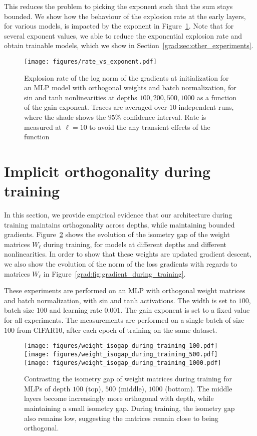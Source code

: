 This reduces the problem to picking the exponent such that the sum stays bounded. We show how the behaviour of the explosion rate at the early layers, for various models, is impacted by the exponent in Figure~\ref{grad:fig:rate_vs_exponent}. Note that for several exponent values, we able to reduce the exponential explosion rate and obtain trainable models, which we show in Section~\ref{grad:sec:other_experiments}.

\begin{figure}[ht]
    \centering
    \texttt{[image: figures/rate\_vs\_exponent.pdf]}
    \caption{Explosion rate of the log norm of the gradients at initialization for an MLP model with orthogonal weights and batch normalization, for sin and tanh nonlinearities at depths $100, 200, 500, 1000$ as a function of the gain exponent. Traces are averaged over $10$ independent runs, where the shade shows the $95\%$ confidence interval. Rate is measured at $\ell=10$ to avoid the any transient effects of the function}
    \label{grad:fig:rate_vs_exponent}
\end{figure}

\section{Implicit orthogonality during training}
\label{grad:sec:implicity_orthogonality}
In this section, we provide empirical evidence that our architecture during training maintains orthogonality across depths, while maintaining bounded gradients. Figure~\ref{grad:fig:ortho_during_training} shows the evolution of the isometry gap of the weight matrices $W_\ell$ during training, for models at different depths and different nonlinearities. In order to show that these weights are updated gradient descent, we also show the evolution of the norm of the loss gradients with regards to matrices $W_\ell$ in Figure~\ref{grad:fig:gradient_during_training}. 

These experiments are performed on an MLP with orthogonal weight matrices and batch normalization, with sin and tanh activations. The width is set to $100$, batch size $100$ and learning rate $0.001$. The gain exponent is set to a fixed value for all experiments. The measurements are performed on a single batch of size $100$ from CIFAR10, after each epoch of training on the same dataset. 

\begin{figure}[htp!]
    \centering
    \texttt{[image: figures/weight\_isogap\_during\_training\_100.pdf]}
    \texttt{[image: figures/weight\_isogap\_during\_training\_500.pdf]}
    \texttt{[image: figures/weight\_isogap\_during\_training\_1000.pdf]}
    \caption{Contrasting the isometry gap of weight matrices during training for MLPs of depth $100$ (top), $500$ (middle), $1000$ (bottom). The middle layers become increasingly more orthogonal with depth, while maintaining a small isometry gap. During training, the isometry gap also remains low, suggesting the matrices remain close to being orthogonal.}
    \label{grad:fig:ortho_during_training}
\end{figure}


